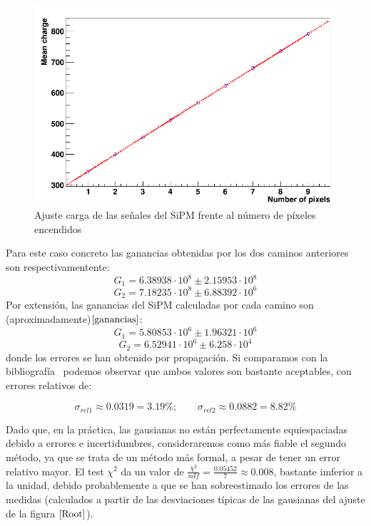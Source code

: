 \begin{enumerate}
\begin{enumerate}
	\begin{figure}[hbtp]
		\centering
		\includegraphics[scale=0.4]{FitPosicionPixels.png}
		\caption{Ajuste carga de las señales del SiPM frente al número de píxeles encendidos\label{ajuste}}
		\end{figure}
			
	\end{enumerate}
	
Para este caso concreto las ganancias obtenidas por los dos caminos anteriores son respectivamentente:
\begin{equation}
G_1= 6.38938 \cdot 10^8 \pm 2.15953 \cdot 10^8
\label{gananciatotalmetodo1} 
\end{equation}
\begin{equation}
G_2=7.18235 \cdot 10^8 \pm 6.88392 \cdot 10^6
\label{gananciatotalmetodo2}
\end{equation}
Por extensión, las ganancias del SiPM calculadas por cada camino son (aproximadamente)$\eqref{ganancias}$: 
\begin{equation}
G_1= 5.80853 \cdot 10^6 \pm 1.96321 \cdot 10^6
\label{gananciaSiPMmetodo1}
\end{equation}
\begin{equation}
G_2= 6.52941 \cdot 10^6 \pm 6.258 \cdot 10^4
\label{gananciaSiPMmetodo2}
\end{equation}
donde los errores se han obtenido por propagación. Si comparamos con la bibliografía~\cite{datasheet SiPM} podemos observar que ambos valores son bastante aceptables, con errores relativos de:

\begin{equation}
\sigma_{rel1} \approx 0.0319 = 3.19\%; \qquad \sigma_{rel2} \approx 0.0882 = 8.82\%
\label{erroresgananciasSiPM}
\end{equation}


Dado que, en la práctica, las gausianas no están perfectamente equiespaciadas debido a errores e incertidumbres, consideraremos como más fiable el segundo método, ya que se trata de un método más formal, a pesar de tener un error relativo mayor.
El test $\chi^2$ da un valor de  $\frac{\chi^2}{ndf}=\frac{0.05452}{7}\approx 0.008$, bastante imferior a la unidad, debido  probablemente a que se han sobreestimado los errores de las medidas (calculados a partir de las desviaciones típicas de las gausianas del ajuste de la figura $\ref{Root}$).

\end{enumerate}
